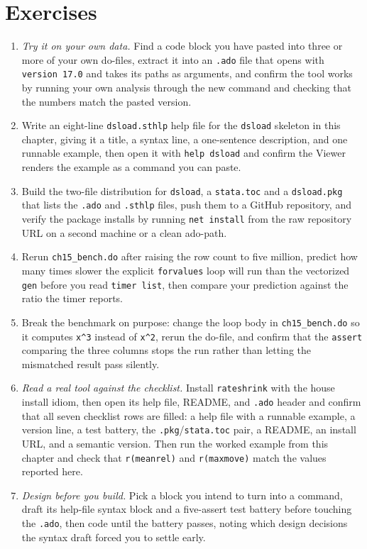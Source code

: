 \documentclass[
    a4paper,
    fontsize=10pt,
    twoside=true,
    numbers=noenddot,
]{kaobook}
\begin{document}
\section*{Exercises}
\begin{enumerate}
    \item \emph{Try it on your own data.} Find a code block you have pasted into three or more of your own do-files, extract it into an \texttt{.ado} file that opens with \texttt{version 17.0} and takes its paths as arguments, and confirm the tool works by running your own analysis through the new command and checking that the numbers match the pasted version.
    \item Write an eight-line \texttt{dsload.sthlp} help file for the \texttt{dsload} skeleton in this chapter, giving it a title, a syntax line, a one-sentence description, and one runnable example, then open it with \texttt{help dsload} and confirm the Viewer renders the example as a command you can paste.
    \item Build the two-file distribution for \texttt{dsload}, a \texttt{stata.toc} and a \texttt{dsload.pkg} that lists the \texttt{.ado} and \texttt{.sthlp} files, push them to a GitHub repository, and verify the package installs by running \texttt{net install} from the raw repository URL on a second machine or a clean ado-path.
    \item Rerun \texttt{ch15\_bench.do} after raising the row count to five million, predict how many times slower the explicit \texttt{forvalues} loop will run than the vectorized \texttt{gen} before you read \texttt{timer list}, then compare your prediction against the ratio the timer reports.
    \item Break the benchmark on purpose: change the loop body in \texttt{ch15\_bench.do} so it computes \texttt{x\textasciicircum 3} instead of \texttt{x\textasciicircum 2}, rerun the do-file, and confirm that the \texttt{assert} comparing the three columns stops the run rather than letting the mismatched result pass silently.
    \item \emph{Read a real tool against the checklist.} Install \texttt{rateshrink} with the house install idiom, then open its help file, README, and \texttt{.ado} header and confirm that all seven checklist rows are filled: a help file with a runnable example, a version line, a test battery, the \texttt{.pkg}/\texttt{stata.toc} pair, a README, an install URL, and a semantic version. Then run the worked example from this chapter and check that \texttt{r(meanrel)} and \texttt{r(maxmove)} match the values reported here.
    \item \emph{Design before you build.} Pick a block you intend to turn into a command, draft its help-file syntax block and a five-assert test battery before touching the \texttt{.ado}, then code until the battery passes, noting which design decisions the syntax draft forced you to settle early.
\end{enumerate}
\end{document}

